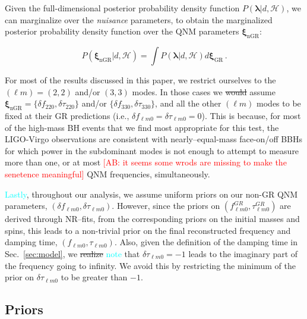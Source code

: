 \documentclass[twocolumn,prd,aps,superscriptaddress,preprintnumbers,tightenlines,showpacs,nofootinbib,eqsecnum,amsfonts,amsmath]{revtex4-1}
\newcommand{\ab}[1]{\textcolor{cyan}{#1}}
\newcommand{\comment}[1]{\textcolor{red}{[#1]}}
\newcommand{\blambda}{\bm{\lambda}}
\newcommand{\bxigr}{\bm{\xi}_{\text{GR}}}
\newcommand{\bxingr}{\bm{\xi}_{\text{nGR}}}
\newcommand{\df}[1]{\delta f_{\text{#1}}}
\newcommand{\dtau}[1]{\delta \tau_{\text{#1}}}
\begin{document}
Given the full-dimensional posterior probability density function $P(\blambda | d, \mathcal{H})$, we can marginalize over the \emph{nuisance} parameters, to obtain the marginalized posterior probability density function over the QNM parameters $\bxingr$:

\begin{equation}
P(\bxingr | d, \mathcal{H})= \int P(\blambda | d, \mathcal{H}) d\bxigr\,.
\end{equation}

For most of the results discussed in this paper, we restrict ourselves
to the $(\ell m) = (2,2)$ and/or $(3,3)$ modes. In those cases we
\sout{would} assume $\bxingr = \{\df{220},\dtau{220}\}$ and/or $
\{\df{330},\dtau{330}\}$, and all the other $(\ell m)$ modes to be
fixed at their GR predictions (i.e., $\delta f_{\ell m 0} = \delta
\tau_{\ell m 0} = 0$). This is because, for most of the high-mass BH 
events that we find most appropriate for this test, the LIGO-Virgo
observations are consistent with nearly--equal-mass face-on/off BBHs 
for which power in the subdominant modes is not enough to
attempt to measure more than one, or at most \comment{AB: it seems some wrods are missing 
to make the senetence meaningful} QNM frequencies, 
simultaneously.

\ab{Lastly}, throughout our analysis, we assume uniform priors on our non-GR QNM
parameters, $(\delta f_{\ell m 0},\delta \tau_{\ell m 0})$. However,
since the priors on $( f_{\ell m 0}^{GR},\tau_{\ell m 0}^{GR})$ are
derived through NR--fits, from the corresponding priors on the initial
masses and spins, this leads to a non-trivial prior on the final
reconstructed frequency and damping time, $( f_{\ell m 0},\tau_{\ell m
  0})$. Also, given the definition of the damping time in
Sec.~\ref{sec:model}, we \sout{realize} \ab{note} that $\delta \tau_{\ell m 0} = -1$ leads
to the imaginary part of the frequency going to infinity. We avoid
this by restricting the minimum of the prior on $\delta \tau_{\ell m
  0}$ to be greater than $-1$.

\iffalse
\subsection{Priors}
\end{document}
